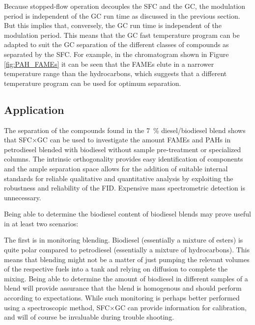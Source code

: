 Because stopped-flow operation decouples the SFC and the GC, the modulation
period is independent of the GC run time as discussed in the previous section.
But this implies that, conversely,  the GC run time is independent of the
modulation period. This means that the GC fast temperature program can be
adapted to suit the GC separation of the different classes of compounds as
separated by the SFC. For example, in the chromatogram shown in Figure
\ref{fig:PAH_FAMEs} it can be seen that the FAMEs elute in a narrower
temperature range than the hydrocarbons, which suggests that a different
temperature program can be used for optimum separation.

\subsection{Application}

The separation of the compounds found in the \SI{7}{\percent} diesel/biodiesel
blend shows that SFC×GC can be used to investigate the amount FAMEs and PAHs in
petrodiesel blended with biodiesel without sample pre-treatment or specialized
columns. The intrinsic orthogonality provides easy identification of components
and the ample separation space allows for the addition of suitable internal
standards for reliable qualitative and quantitative analysis by exploiting the
robustness and reliability of the FID. Expensive mass spectrometric detection is
unnecessary.

Being able to determine the biodiesel content of biodiesel blends may prove
useful in at least two scenarios:

The first is in monitoring blending. Biodiesel (essentially a mixture of esters)
is quite polar compared to petrodiesel (essentially a mixture of hydrocarbons).
This means that blending might not be a matter of just pumping the relevant
volumes of the respective fuels into a tank and relying on diffusion to complete
the mixing. Being able to determine the amount of biodiesel in different samples
of a blend will provide assurance that the blend is homogenous and should
perform according to expectations. While such monitoring is perhaps better
performed using a spectroscopic method, SFC×GC can provide information for
calibration, and will of course be invaluable during trouble shooting.

